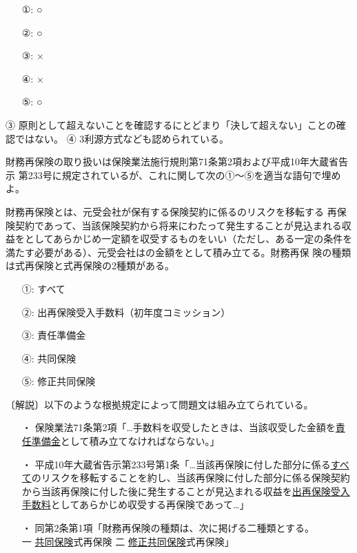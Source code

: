 \documentclass[report,gutter=10mm,fore-edge=10mm,uplatex,dvipdfmx]{jlreq}
\begin{document}
\answer{}

\begin{itemize}
\item[ ①: ] ○
\item[ ②: ] ○
\item[ ③: ] ×
\item[ ④: ] ×
\item[ ⑤: ] ○
\end{itemize}

③ 原則として超えないことを確認するにとどまり「決して超えない」ことの確認ではない。
④ 3利源方式なども認められている。

財務再保険の取り扱いは保険業法施行規則第71条第2項および平成10年大蔵省告示
第233号に規定されているが、これに関して次の①〜⑤を適当な語句で埋めよ。

財務再保険とは、元受会社が保有する保険契約に係るのリスクを移転する
再保険契約であって、当該保険契約から将来にわたって発生することが見込まれる収
益をとしてあらかじめ一定額を収受するものをいい（ただし、ある一定の条件を
満たす必要がある）、元受会社はの金額をとして積み立てる。財務再保
険の種類は式再保険と式再保険の2種類がある。

\answer{}
\begin{itemize}
\item[ ①: ] すべて
\item[ ②: ] 出再保険受入手数料（初年度コミッション）
\item[ ③: ] 責任準備金
\item[ ④: ] 共同保険
\item[ ⑤: ] 修正共同保険
\end{itemize}

〔解説〕以下のような根拠規定によって問題文は組み立てられている。
\begin{itemize}
\item[ ・]  保険業法71条第2項「…手数料を収受したときは、当該収受した金額を\underline{責任準備金}として積み立てなければならない。」
\item[ ・]  平成10年大蔵省告示第233号第1条「…当該再保険に付した部分に係る\underline{すべて}のリスクを移転することを約し、当該再保険に付した部分に係る保険契約から当該再保険に付した後に発生することが見込まれる収益を\underline{出再保険受入手数料}としてあらかじめ収受する再保険であって…」
\item[ ・]  同第2条第1項「財務再保険の種類は、次に掲げる二種類とする。\\
 一 \underline{共同保険}式再保険 二 \underline{修正共同保険}式再保険」
\end{itemize}
\end{document}
